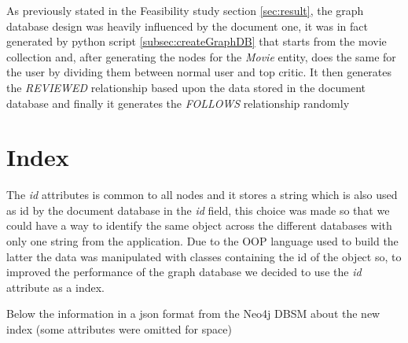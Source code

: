 As previously stated in the Feasibility study section \ref{sec:result}, the graph database design was heavily influenced by the document one, it was in fact generated by python script \cref{subsec:createGraphDB} that starts from the movie collection and, after generating the nodes for the \emph{Movie} entity, does the same for the user by dividing them between normal user and top critic. It then generates the \emph{REVIEWED} relationship based upon the data stored in the document database and finally it generates the \emph{FOLLOWS} relationship randomly

\section{Index}
The \emph{id} attributes is common to all nodes and it stores a string which is also used as id by the document database in the \emph{\textunderscore id} field, this choice was made so that we could have a way to identify the same object across the different databases with only one string from the application. Due to the OOP language used to build the latter the data was manipulated with classes containing the id of the object so, to improved the performance of the graph database we decided to use the \emph{id} attribute as a index. 

Below the information in a json format from the Neo4j DBSM about the new index (some attributes were omitted for space)


